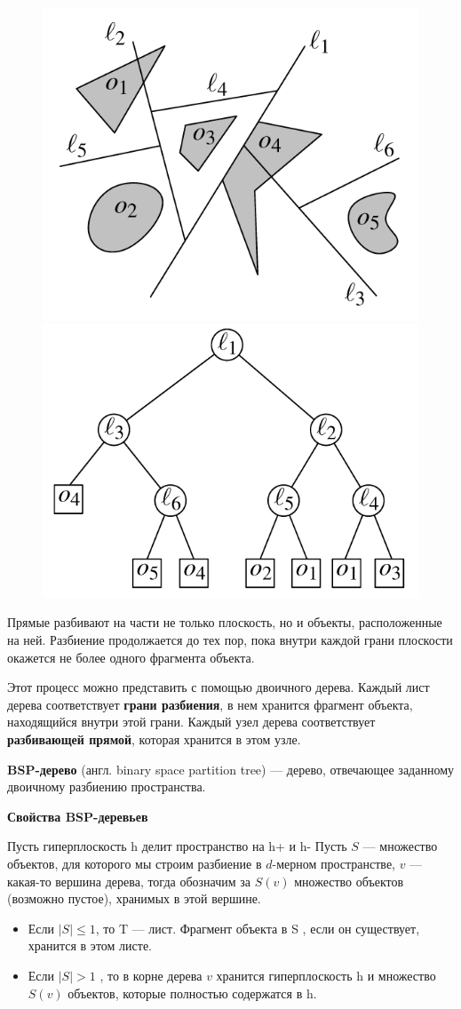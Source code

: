\begin{figure}[h!]
	\centering
	\includegraphics[width=0.4\linewidth]{img/16_3.png}
	\includegraphics[width=0.4\linewidth]{img/16_4.png}
	\captionsetup{labelformat=empty}
	\caption{}
\end{figure}

Прямые разбивают на части не только плоскость, но и объекты, расположенные на ней. Разбиение продолжается до тех пор, пока внутри каждой грани плоскости окажется не более одного фрагмента объекта.

Этот процесс можно представить с помощью двоичного дерева. Каждый лист дерева соответствует \textbf{грани разбиения}, в нем хранится фрагмент объекта, находящийся внутри этой грани. 
Каждый узел дерева соответствует \textbf{разбивающей прямой}, которая хранится в этом узле.

\begin{definition}
	\textbf{BSP-дерево} (англ. binary space partition tree) — дерево, отвечающее заданному двоичному разбиению пространства.
\end{definition}

\textbf{Свойства BSP-деревьев}

Пусть гиперплоскость h делит пространство на h+ и h-
Пусть $S$ — множество объектов, для которого мы строим разбиение в $d$-мерном пространстве, $v$ — какая-то вершина дерева, тогда
обозначим за $S(v)$ множество объектов (возможно пустое), хранимых в этой вершине.
\begin{itemize}
	\item Если $|S| \leq1$, то T — лист. Фрагмент объекта в S , если он существует, хранится в этом листе.
	\item Если $|S| > 1$ , то в корне дерева $v$ хранится гиперплоскость h и множество $S(v)$ объектов, которые полностью содержатся в h.
	
\end{itemize}
